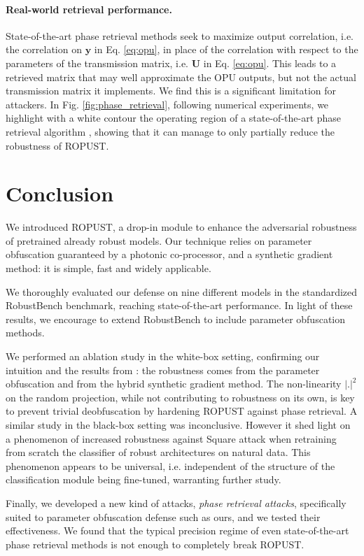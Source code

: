 \documentclass{article}
\begin{document}
\paragraph{Real-world retrieval performance.} State-of-the-art phase retrieval methods seek to maximize output correlation, i.e. the correlation on $\mathbf{y}$ in Eq. \ref{eq:opu}, in place of the correlation with respect to the parameters of the transmission matrix, i.e. $\mathbf{U}$ in Eq. \ref{eq:opu}. This leads to a retrieved matrix that may well approximate the OPU outputs, but not the actual transmission matrix it implements. We find this is a significant limitation for attackers. In Fig. \ref{fig:phase_retrieval}, following numerical experiments, we highlight with a white contour the operating region of a state-of-the-art phase retrieval algorithm \cite{Gupta2020FastOS}, showing that it can manage to only partially reduce the robustness of ROPUST. 
\section{Conclusion}
We introduced ROPUST, a drop-in module to enhance the adversarial robustness of pretrained already robust models. Our technique relies on parameter obfuscation guaranteed by a photonic co-processor, and a synthetic gradient method: it is simple, fast and widely applicable.

We thoroughly evaluated our defense on nine different models in the standardized RobustBench benchmark, reaching state-of-the-art performance. In light of these results, we encourage to extend RobustBench to include parameter obfuscation methods. 

We performed an ablation study in the white-box setting, confirming our intuition and the results from \cite{Cappelli2021AdversarialRB}: the robustness comes from the parameter obfuscation and from the hybrid synthetic gradient method. The non-linearity $|.|^2$ on the random projection, while not contributing to robustness on its own, is key to prevent trivial deobfuscation by hardening ROPUST against phase retrieval.  A similar study in the black-box setting was inconclusive. However it shed light on a phenomenon of increased robustness against Square attack when retraining from scratch the classifier of robust architectures on natural data. This phenomenon appears to be universal, i.e. independent of the structure of the classification module being fine-tuned, warranting further study. 

Finally, we developed a new kind of attacks, \textit{phase retrieval attacks}, specifically suited to parameter obfuscation defense such as ours, and we tested their effectiveness. We found that the typical precision regime of even state-of-the-art phase retrieval methods is not enough to completely break ROPUST.
\end{document}
